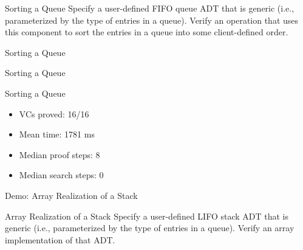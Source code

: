 \begin{frame}{Sorting a Queue}
	Specify a user-defined FIFO queue ADT that is generic (i.e., parameterized by the type of entries in a queue). Verify an operation that uses this component to sort the entries in a queue into some client-defined order.
	\vspace{2em}
	
\end{frame}


\begin{frame}{Sorting a Queue}
	
\end{frame}


\begin{frame}{Sorting a Queue}
	
\end{frame}


\begin{frame}{Sorting a Queue}
	\begin{itemize}
		\item VCs proved: 16/16
		\item Mean time: 1781 ms
		\item Median proof steps: 8
		\item Median search steps: 0
	\end{itemize}
\end{frame}


\begin{frame}{Demo: Array Realization of a Stack}
~
\end{frame}


\begin{frame}{Array Realization of a Stack}
	Specify a user-defined LIFO stack ADT that is generic (i.e., parameterized by the type of entries in a queue). Verify an array implementation of that ADT.
\end{frame}



